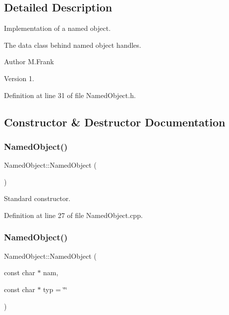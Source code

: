 \subsection{Detailed Description}
Implementation of a named object. 

The data class behind named object handles.

\begin{DoxyAuthor}{Author}
M.\+Frank 
\end{DoxyAuthor}
\begin{DoxyVersion}{Version}
1. 
\end{DoxyVersion}


Definition at line 31 of file Named\+Object.\+h.



\subsection{Constructor \& Destructor Documentation}
\hypertarget{class_d_d4hep_1_1_named_object_a210152aa261bc94e2012f6a0242faae0}{}\label{class_d_d4hep_1_1_named_object_a210152aa261bc94e2012f6a0242faae0} 
\subsubsection{\texorpdfstring{Named\+Object()}{NamedObject()}\hspace{0.1cm}{\footnotesize\ttfamily [1/5]}}
{\footnotesize\ttfamily Named\+Object\+::\+Named\+Object (\begin{DoxyParamCaption}{ }\end{DoxyParamCaption})}



Standard constructor. 



Definition at line 27 of file Named\+Object.\+cpp.

\hypertarget{class_d_d4hep_1_1_named_object_a8d1a329816f1cd08f79dc3fd34bd705a}{}\label{class_d_d4hep_1_1_named_object_a8d1a329816f1cd08f79dc3fd34bd705a} 
\subsubsection{\texorpdfstring{Named\+Object()}{NamedObject()}\hspace{0.1cm}{\footnotesize\ttfamily [2/5]}}
{\footnotesize\ttfamily Named\+Object\+::\+Named\+Object (\begin{DoxyParamCaption}\item[{const char $\ast$}]{nam,  }\item[{const char $\ast$}]{typ = {\ttfamily \char`\"{}\char`\"{}} }\end{DoxyParamCaption})}



